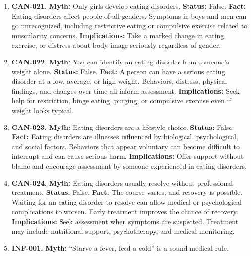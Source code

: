 \documentclass[11pt,oneside]{book}
\begin{document}
\begin{enumerate}[leftmargin=0pt,labelwidth=0pt,labelsep=0pt,itemindent=0pt]
\item[] \textbf{CAN-021.} \textbf{Myth:} Only girls develop eating disorders.\newline
\textbf{Status:} False.\newline
\textbf{Fact:} Eating disorders affect people of all genders. Symptoms in boys and men can go unrecognized, including restrictive eating or compulsive exercise related to muscularity concerns. \cite{ref186}\newline
\textbf{Implications:} Take a marked change in eating, exercise, or distress about body image seriously regardless of gender.
\item[] \textbf{CAN-022.} \textbf{Myth:} You can identify an eating disorder from someone's weight alone.\newline
\textbf{Status:} False.\newline
\textbf{Fact:} A person can have a serious eating disorder at a low, average, or high weight. Behaviors, distress, physical findings, and changes over time all inform assessment. \cite{ref186}\newline
\textbf{Implications:} Seek help for restriction, binge eating, purging, or compulsive exercise even if weight looks typical.
\item[] \textbf{CAN-023.} \textbf{Myth:} Eating disorders are a lifestyle choice.\newline
\textbf{Status:} False.\newline
\textbf{Fact:} Eating disorders are illnesses influenced by biological, psychological, and social factors. Behaviors that appear voluntary can become difficult to interrupt and can cause serious harm. \cite{ref186}\newline
\textbf{Implications:} Offer support without blame and encourage assessment by someone experienced in eating disorders.
\item[] \textbf{CAN-024.} \textbf{Myth:} Eating disorders usually resolve without professional treatment.\newline
\textbf{Status:} False.\newline
\textbf{Fact:} The course varies, and recovery is possible. Waiting for an eating disorder to resolve can allow medical or psychological complications to worsen. Early treatment improves the chance of recovery. \cite{ref186}\newline
\textbf{Implications:} Seek assessment when symptoms are suspected. Treatment may include nutritional support, psychotherapy, and medical monitoring.
\item[] \textbf{INF-001.} \textbf{Myth:} ``Starve a fever, feed a cold'' is a sound medical rule.\newline

\end{enumerate}
\end{document}
